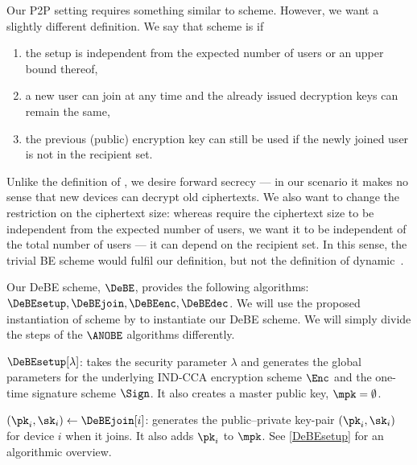 Our \ac{P2P} setting requires something similar to  scheme.
However, we want a slightly different definition.
We say that  scheme is  if
\begin{enumerate}
  \item the setup is independent from the expected number of users or an upper 
    bound thereof,
  \item a new user can join at any time and the already issued decryption keys 
    can remain the same,
  \item the previous (public) encryption key can still be used if the newly 
    joined user is not in the recipient set.
\end{enumerate}
Unlike the definition of \textcite{DynamicBroadcastEncryption}, we desire 
forward secrecy --- in our scenario it makes no sense that new devices can 
decrypt old ciphertexts.
We also want to change the restriction on the ciphertext size:
whereas \textcite{DynamicBroadcastEncryption} require the ciphertext size to be 
independent from the expected number of users, we want it to be independent of 
the total number of users --- \ie it can depend on the recipient set.
In this sense, the trivial \ac{BE} scheme would fulfil our definition, but not 
the definition of dynamic~\cite{DynamicBroadcastEncryption}.

\NewAlgorithm{\DeBEsetup}{\DeBE[Setup]}
\NewAlgorithm{\DeBEjoin}{\DeBE[Join]}
\NewAlgorithm{\DeBEenc}{\DeBE[Enc]}
\NewAlgorithm{\DeBEdec}{\DeBE[Dec]}

Our \ac{DeBE} scheme, \(\DeBE\), provides the following algorithms:
\(\DeBEsetup, \allowbreak \DeBEjoin, \allowbreak \DeBEenc, \allowbreak 
  \DeBEdec\).
We will use the proposed instantiation of  scheme by \textcite{ANOBE} 
to instantiate our \ac{DeBE} scheme.
We will simply divide the steps of the \(\ANOBE\) algorithms differently.


\(\DeBEsetup[\lambda]\): takes the security parameter \(\lambda\) and generates 
the global parameters for the underlying IND-CCA encryption scheme \(\Enc\) and 
the one-time signature scheme \(\Sign\).
It also creates a master public key, \(\mpk = \emptyset\).


\((\pk_i, \sk_i)\gets \DeBEjoin[i]\): generates the public--private key-pair 
\((\pk_i, \sk_i)\) for device \(i\) when it joins.
It also adds \(\pk_i\) to \(\mpk\).
See \cref{DeBEsetup} for an algorithmic overview.

